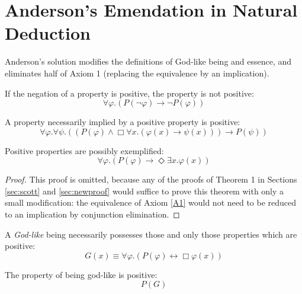 \documentclass[smallextended]{svjour3}
\newcommand{\imp}{\rightarrow}
\newcommand{\biimp}{\leftrightarrow}
\newcommand{\all}{\forall}
\newcommand{\ex}{\exists}
\newcommand{\nec}{\Box} %
\newcommand{\pos}{\Diamond} %
\begin{document}
\section{Anderson's Emendation in Natural Deduction}
\label{sec:anderson}


Anderson's solution \citep{and90} modifies the definitions of God-like being and essence, and eliminates half of Axiom 1 (replacing the equivalence by an implication).  





\setcounter{axiom}{0}
\setcounter{lemma}{0}
\setcounter{theorem}{0}
\setcounter{corollary}{0}
\setcounter{definition}{0}

\begin{axiom}[Emended]
\label{A:A1}
If the negation of a property is positive, the property is not positive:
$$
\all \varphi. (P(\neg \varphi) \imp \neg P(\varphi))
$$
\end{axiom}

\begin{axiom}[As in Scott's]
\label{A:A2}
A property necessarily implied by a positive property is positive:
$$
\all \varphi. \all \psi.((P(\varphi) \wedge \nec \all x.(\varphi(x) \imp \psi(x))) \imp P(\psi))
$$
\end{axiom}


\begin{theorem}
\label{A:T1}
Positive properties are possibly exemplified:
$$
\all \varphi. (P(\varphi) \imp \pos \ex x.\varphi(x))
$$
\end{theorem}
\begin{proof}
This proof is omitted, because any of the proofs of Theorem 1 in Sections \ref{sec:scott} and \ref{sec:newproof} would suffice to prove this theorem with only a small modification: the equivalence of Axiom \ref{A1} would not need to be reduced to an implication by conjunction elimination. 
\end{proof}



\begin{definition}[Emended]
\label{A:D1}
A \emph{God-like} being necessarily possesses those and only those properties which are positive:
$$
G(x) \equiv \forall \varphi. (P(\varphi) \biimp \nec \varphi(x))
$$
\end{definition}

\begin{axiom}[As in Scott's]
\label{A:A3}
The property of being god-like is positive:
$$
P(G)
$$
\end{axiom}
\end{document}
